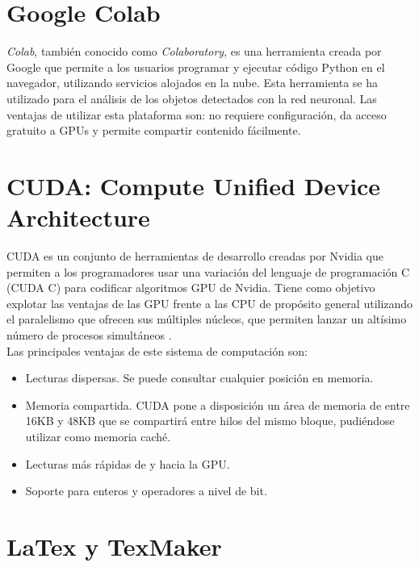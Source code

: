 \section{Google Colab}

\textit{Colab}, también conocido como \textit{Colaboratory}, es una herramienta creada por Google que permite a los usuarios programar y ejecutar código Python en el navegador, utilizando servicios alojados en la nube. Esta herramienta se ha utilizado para el análisis de los objetos detectados con la red neuronal. Las ventajas de utilizar esta plataforma son: no requiere configuración, da acceso gratuito a GPUs y permite compartir contenido fácilmente.\\

\section{CUDA: Compute Unified Device Architecture} \label{apendA.cuda}

CUDA es un conjunto de herramientas de desarrollo creadas por Nvidia que permiten a los programadores usar una variación del lenguaje de programación C (CUDA C) para codificar algoritmos GPU de Nvidia. Tiene como objetivo explotar las ventajas de las GPU frente a las CPU de propósito general utilizando el paralelismo que ofrecen sus múltiples núcleos, que permiten lanzar un altísimo número de procesos simultáneos \cite{cuda}.\\

Las principales ventajas de este sistema de computación son:

\begin{itemize}

	\item Lecturas dispersas. Se puede consultar cualquier posición en memoria.
	\item Memoria compartida. CUDA pone a disposición un área de memoria de entre 16KB y 48KB que se compartirá entre hilos del mismo bloque, pudiéndose utilizar como memoria caché.
	\item Lecturas más rápidas de y hacia la GPU.
	\item Soporte para enteros y operadores a nivel de bit.

\end{itemize}

\section{LaTex y TexMaker}


